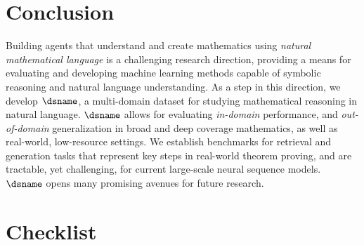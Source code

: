 \section{Conclusion}
Building agents that understand and create mathematics using \textit{natural mathematical language} is a challenging research direction, providing a means for evaluating and developing machine learning methods capable of symbolic reasoning and natural language understanding.
As a step in this direction, we develop $\dsname$, a multi-domain dataset for studying mathematical reasoning in natural language.
$\dsname$ allows for evaluating \textit{in-domain} performance, and \textit{out-of-domain} generalization in broad and deep coverage mathematics, as well as real-world, low-resource settings.
We establish benchmarks for retrieval and generation tasks that represent key steps in real-world theorem proving,
and are tractable, yet challenging, for current large-scale neural sequence models.
$\dsname$ opens many promising avenues for future research.

\section*{Checklist}

